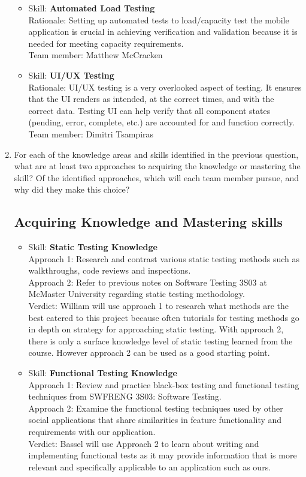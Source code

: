 \documentclass[12pt, titlepage]{article}
\begin{document}
\begin{enumerate}
\begin{itemize}
			\item Skill: \textbf{Automated Load Testing}
			\\ Rationale: Setting up automated tests to load/capacity test the mobile application is crucial in achieving verification and validation because it is needed for meeting capacity requirements.
			\\ Team member: Matthew McCracken
			
			\item Skill: \textbf{UI/UX Testing}
			\\ Rationale: UI/UX testing is a very overlooked aspect of testing. It ensures that the UI renders as intended, at the correct times, and with the correct data. Testing UI can help verify that all component states (pending, error, complete, etc.) are accounted for and function correctly.
			\\ Team member: Dimitri Tsampiras
		\end{itemize}
		\item For each of the knowledge areas and skills identified in the previous
		question, what are at least two approaches to acquiring the knowledge or
		mastering the skill?  Of the identified approaches, which will each team
		member pursue, and why did they make this choice?
		\subsection{Acquiring Knowledge and Mastering skills}
		\begin{itemize}
			\item Skill: \textbf{Static Testing Knowledge}
			\\ Approach 1: Research and contrast various static testing methods such as walkthroughs, code reviews and inspections.
			\\ Approach 2: Refer to previous notes on Software Testing 3S03 at McMaster University regarding static testing methodology.
			\\ Verdict: William will use approach 1 to research what methods are the best catered to this project because often tutorials for testing methods go in depth on strategy for approaching static testing. With approach 2, there is only a surface knowledge level of static testing learned from the course. However approach 2 can be used as a good starting point.
			
			\item Skill: \textbf{Functional Testing Knowledge}
			\\Approach 1: Review and practice black-box testing and functional testing techniques from SWFRENG 3S03: Software Testing.
			\\Approach 2: Examine the functional testing techniques used by other social applications that share similarities in feature functionality and requirements with our application.
			\\Verdict: Bassel will use Approach 2 to learn about writing and implementing functional tests as it may provide information that is more relevant and specifically applicable to an application such as ours.
			

\end{itemize}
\end{enumerate}
\end{document}
